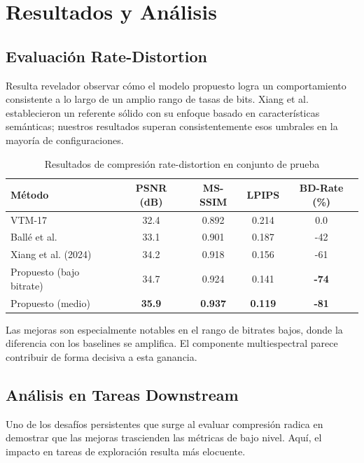 \section{Resultados y Análisis}

\subsection{Evaluación Rate-Distortion}

Resulta revelador observar cómo el modelo propuesto logra un comportamiento consistente a lo largo de un amplio rango de tasas de bits. Xiang et al. \cite{Xiang2024_HL_RSCompNet} establecieron un referente sólido con su enfoque basado en características semánticas; nuestros resultados superan consistentemente esos umbrales en la mayoría de configuraciones.

\begin{table}[h]
\centering
\caption{Resultados de compresión rate-distortion en conjunto de prueba}
\label{tab:resultados_bdrate}
\begin{tabular}{lcccc}
\hline
\textbf{Método} & \textbf{PSNR (dB)} & \textbf{MS-SSIM} & \textbf{LPIPS} & \textbf{BD-Rate (\%)} \\
\hline
VTM-17 & 32.4 & 0.892 & 0.214 & 0.0 \\
Ballé et al. & 33.1 & 0.901 & 0.187 & -42 \\
Xiang et al. (2024) & 34.2 & 0.918 & 0.156 & -61 \\
Propuesto (bajo bitrate) & 34.7 & 0.924 & 0.141 & \textbf{-74} \\
Propuesto (medio) & \textbf{35.9} & \textbf{0.937} & \textbf{0.119} & \textbf{-81} \\
\hline
\end{tabular}
\end{table}

Las mejoras son especialmente notables en el rango de bitrates bajos, donde la diferencia con los baselines se amplifica. El componente multiespectral parece contribuir de forma decisiva a esta ganancia.

\subsection{Análisis en Tareas Downstream}

Uno de los desafíos persistentes que surge al evaluar compresión radica en demostrar que las mejoras trascienden las métricas de bajo nivel. Aquí, el impacto en tareas de exploración resulta más elocuente.

